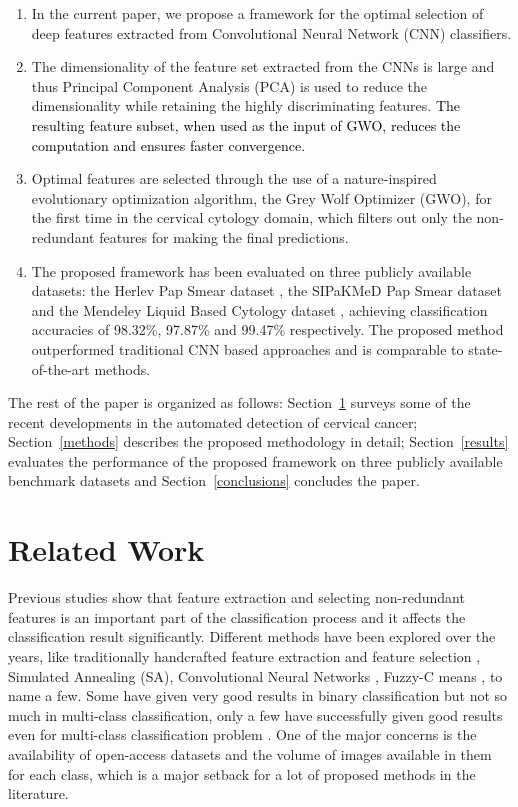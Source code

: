 \documentclass{llncs}
\begin{document}
\begin{enumerate}
    \item In the current paper, we propose a framework for the optimal selection of deep features extracted from Convolutional Neural Network (CNN) classifiers.
    \item The dimensionality of the feature set extracted from the CNNs is large and thus Principal Component Analysis (PCA) is used to reduce the dimensionality while retaining the highly discriminating features. \textcolor{black}{The resulting feature subset, when used as the input of GWO, reduces the computation and ensures faster convergence.}
    \item Optimal features are selected through the use of a nature-inspired evolutionary optimization algorithm, the Grey Wolf Optimizer (GWO), for the first time in the cervical cytology domain, which filters out only the non-redundant features for making the final predictions.
    \item The proposed framework has been evaluated on three publicly available datasets: the Herlev Pap Smear dataset \cite{jantzen2005pap}, the SIPaKMeD Pap Smear dataset \cite{plissiti2018sipakmed} and the Mendeley Liquid Based Cytology dataset \cite{hussain2020liquid}, achieving classification accuracies of 98.32\%, 97.87\% and 99.47\% respectively. The proposed method outperformed traditional CNN based approaches and is comparable to state-of-the-art methods.
\end{enumerate}

The rest of the paper is organized as follows: Section~\ref{relwork} surveys some of the recent developments in the automated detection of cervical cancer; Section~\ref{methods} describes the proposed methodology in detail; Section~\ref{results} evaluates the performance of the proposed framework on three publicly available benchmark datasets and Section~\ref{conclusions} concludes the paper.
\section{Related Work}\label{relwork}
Previous studies show that feature extraction and selecting non-redundant features is an important part of the classification process and it affects the classification result significantly. Different methods have been explored over the years, like traditionally handcrafted feature extraction and feature selection \cite{almubarak2019hybrid}, Simulated Annealing (SA)\cite{wang2005simulated}, Convolutional Neural Networks \cite{wu2018automatic}, Fuzzy-C means \cite{william2019cervical}, to name a few. Some have given very good results in binary classification but not so much in multi-class classification, only a few have successfully given good results even for multi-class classification problem \cite{bora2017automated, chankong2014automatic, martinez2020classifying}. One of the major concerns is the availability of open-access datasets and the volume of images available in them for each class, which is a major setback for a lot of proposed methods in the literature. 
\end{document}
